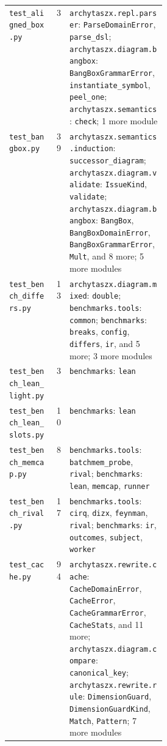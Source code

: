 \begin{xltabular}{\linewidth}{@{}>{\raggedright\arraybackslash}p{0.3\linewidth}r>{\raggedright\arraybackslash}X@{}}
\texttt{test\_\allowbreak{}aligned\_\allowbreak{}box.py} & 3 & \texttt{archytaszx.\allowbreak{}repl.\allowbreak{}parser}: \texttt{ParseDomainError}, \texttt{parse\_\allowbreak{}dsl}; \texttt{archytaszx.\allowbreak{}diagram.\allowbreak{}bangbox}: \texttt{BangBoxGrammarError}, \texttt{instantiate\_\allowbreak{}symbol}, \texttt{peel\_\allowbreak{}one}; \texttt{archytaszx.\allowbreak{}semantics}: \texttt{check}; 1 more module \\
\texttt{test\_\allowbreak{}bangbox.py} & 39 & \texttt{archytaszx.\allowbreak{}semantics.\allowbreak{}induction}: \texttt{successor\_\allowbreak{}diagram}; \texttt{archytaszx.\allowbreak{}diagram.\allowbreak{}validate}: \texttt{IssueKind}, \texttt{validate}; \texttt{archytaszx.\allowbreak{}diagram.\allowbreak{}bangbox}: \texttt{BangBox}, \texttt{BangBoxDomainError}, \texttt{BangBoxGrammarError}, \texttt{Mult}, and 8 more; 5 more modules \\
\texttt{test\_\allowbreak{}bench\_\allowbreak{}differs.py} & 13 & \texttt{archytaszx.\allowbreak{}diagram.\allowbreak{}mixed}: \texttt{double}; \texttt{benchmarks.\allowbreak{}tools}: \texttt{common}; \texttt{benchmarks}: \texttt{breaks}, \texttt{config}, \texttt{differs}, \texttt{ir}, and 5 more; 3 more modules \\
\texttt{test\_\allowbreak{}bench\_\allowbreak{}lean\_\allowbreak{}light.py} & 3 & \texttt{benchmarks}: \texttt{lean} \\
\texttt{test\_\allowbreak{}bench\_\allowbreak{}lean\_\allowbreak{}slots.py} & 10 & \texttt{benchmarks}: \texttt{lean} \\
\texttt{test\_\allowbreak{}bench\_\allowbreak{}memcap.py} & 8 & \texttt{benchmarks.\allowbreak{}tools}: \texttt{batchmem\_\allowbreak{}probe}, \texttt{rival}; \texttt{benchmarks}: \texttt{lean}, \texttt{memcap}, \texttt{runner} \\
\texttt{test\_\allowbreak{}bench\_\allowbreak{}rival.py} & 17 & \texttt{benchmarks.\allowbreak{}tools}: \texttt{cirq}, \texttt{dizx}, \texttt{feynman}, \texttt{rival}; \texttt{benchmarks}: \texttt{ir}, \texttt{outcomes}, \texttt{subject}, \texttt{worker} \\
\texttt{test\_\allowbreak{}cache.py} & 94 & \texttt{archytaszx.\allowbreak{}rewrite.\allowbreak{}cache}: \texttt{CacheDomainError}, \texttt{CacheError}, \texttt{CacheGrammarError}, \texttt{CacheStats}, and 11 more; \texttt{archytaszx.\allowbreak{}diagram.\allowbreak{}compare}: \texttt{canonical\_\allowbreak{}key}; \texttt{archytaszx.\allowbreak{}rewrite.\allowbreak{}rule}: \texttt{DimensionGuard}, \texttt{DimensionGuardKind}, \texttt{Match}, \texttt{Pattern}; 7 more modules \\

\end{xltabular}
